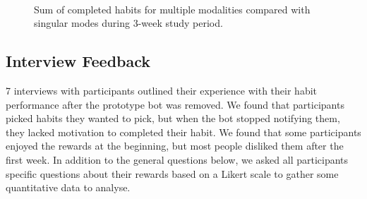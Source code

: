 \documentclass{scaffold/sigchi}
\begin{document}
\begin{figure}
  \centering
  \caption{Sum of completed habits for multiple modalities compared with singular modes during 3-week study period.}~\label{fig:c2_h2}
\end{figure}



\subsection{Interview Feedback}
7 interviews with participants outlined their experience with their habit performance after the prototype bot was removed. We found that participants picked habits they wanted to pick, but when the bot stopped notifying them, they lacked motivation to completed their habit. We found that some participants enjoyed the rewards at the beginning, but most people disliked them after the first week. In addition to the general questions below, we asked all participants specific questions about their rewards based on a Likert scale to gather some quantitative data to analyse.
\end{document}
